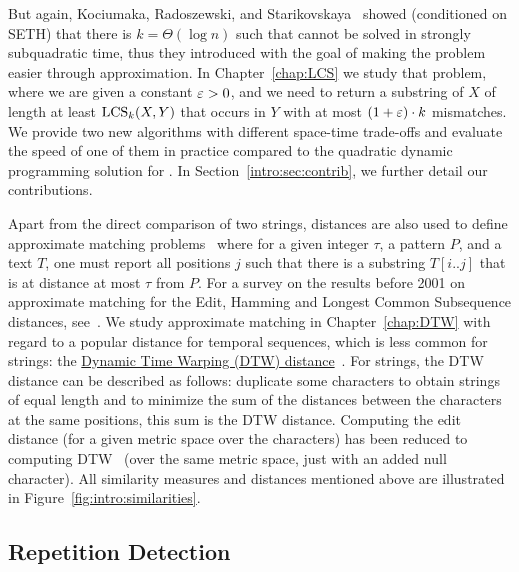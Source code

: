 But again, Kociumaka, Radoszewski, and Starikovskaya~\cite{DBLP:journals/algorithmica/KociumakaRS19} showed (conditioned on SETH) that there is $k=\Theta(\log n)$ such that \kLCS cannot be solved in strongly subquadratic time, thus they introduced \kApproxLCS with the goal of making the problem easier through approximation.
In Chapter~\ref{chap:LCS} we study that problem, where we are given a constant $\varepsilon > 0$, and we need to return a substring of $X$ of length at least $\mathrm{LCS}_{k}(X,Y)$ that occurs in $Y$ with at most $(1+\varepsilon) \cdot k$ mismatches. We provide two new algorithms with different space-time trade-offs and evaluate the speed of one of them in practice compared to the quadratic dynamic programming solution for \kLCS. In Section~\ref{intro:sec:contrib}, we further detail our contributions.

Apart from the direct comparison of two strings, distances are also used to define approximate matching problems~\cite{landau1986efficient,landau1989fast} where for a given integer $\tau$, a pattern $P$, and a text $T$, one must report all positions $j$ such that there is a substring $T[i..j]$ that is at distance at most $\tau$ from $P$.
For a survey on the results before 2001 on approximate matching for the Edit, Hamming and Longest Common Subsequence distances, see~\cite{navarro2001guided}.
We study approximate matching in Chapter~\ref{chap:DTW} with regard to a popular distance for temporal sequences, which is less common for strings: the \underline{Dynamic Time Warping (DTW) distance}~\cite{sakoe1978dynamic}. For strings, the DTW distance can be described as follows: duplicate some characters to obtain strings of equal length and to minimize the sum of the distances between the characters at the same positions, this sum is the DTW distance. Computing the edit distance (for a given metric space over the characters) has been reduced to computing DTW~\cite{DBLP:conf/icalp/Kuszmaul19} (over the same metric space, just with an added null character).
%
All similarity measures and distances mentioned above are illustrated in Figure~\ref{fig:intro:similarities}.



\subsection{Repetition Detection}

